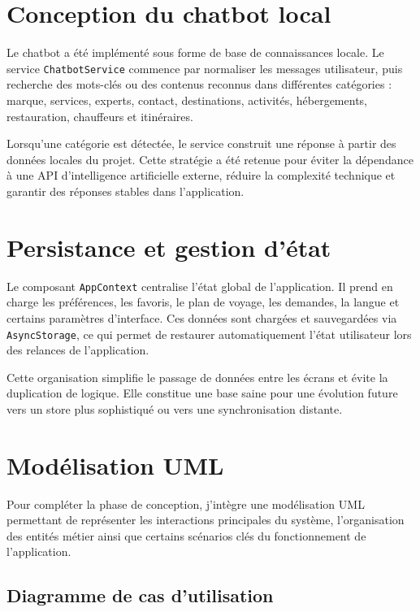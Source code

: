 \documentclass[12pt,a4paper]{report}
\begin{document}
\section{Conception du chatbot local}

Le chatbot a été implémenté sous forme de base de connaissances locale. Le service \texttt{ChatbotService} commence par normaliser les messages utilisateur, puis recherche des mots-clés ou des contenus reconnus dans différentes catégories : marque, services, experts, contact, destinations, activités, hébergements, restauration, chauffeurs et itinéraires.

Lorsqu'une catégorie est détectée, le service construit une réponse à partir des données locales du projet. Cette stratégie a été retenue pour éviter la dépendance à une API d'intelligence artificielle externe, réduire la complexité technique et garantir des réponses stables dans l'application.

\section{Persistance et gestion d'état}

Le composant \texttt{AppContext} centralise l'état global de l'application. Il prend en charge les préférences, les favoris, le plan de voyage, les demandes, la langue et certains paramètres d'interface. Ces données sont chargées et sauvegardées via \texttt{AsyncStorage}, ce qui permet de restaurer automatiquement l'état utilisateur lors des relances de l'application.

Cette organisation simplifie le passage de données entre les écrans et évite la duplication de logique. Elle constitue une base saine pour une évolution future vers un store plus sophistiqué ou vers une synchronisation distante.

\section{Modélisation UML}

Pour compléter la phase de conception, j'intègre une modélisation UML permettant de représenter les interactions principales du système, l'organisation des entités métier ainsi que certains scénarios clés du fonctionnement de l'application.

\subsection{Diagramme de cas d'utilisation}
\end{document}
